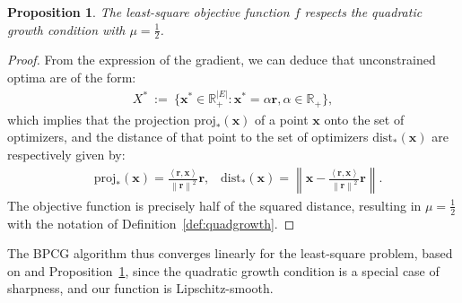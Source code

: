 \documentclass{ecai}
\newtheorem{proposition}[theorem]{Proposition}
\newcommand{\innp}[2]{\left\langle #1, #2 \right\rangle}
\newcommand{\norm}[1]{\left\| #1 \right\|}
\newcommand{\vx}{\mathbf{x}}
\newcommand{\vr}{\mathbf{r}}
\newcommand{\R}{\mathbb{R}}
\begin{document}
\begin{proposition}\label{prop:objquadratic}
The least-square objective function $f$ respects the quadratic growth condition with $\mu=\frac12$.
\end{proposition}
\begin{proof}
From the expression of the gradient, we can deduce that unconstrained optima are of the form:
\begin{align*}
X^* \ \mathrm{:=}\  \{\vx^* \in \R^{|E|}_+ : \vx^* = \alpha \vr, \alpha \in \R_+\} ,
\end{align*}
which implies that the projection $\mathrm{proj}_*(\vx)$ of a point $\vx$ onto the set of optimizers, and the distance of that point to the set of optimizers $\mathrm{dist}_*(\vx)$ are respectively given by:
\begin{align*}
    & \mathrm{proj}_*(\vx) = \frac{\innp{\vr}{\vx}}{\norm{\vr}^2} \vr, \; \; \; \mathrm{dist}_*(\vx) = \left\| \vx - \frac{\innp{\vr}{\vx}}{\norm{\vr}^2} \vr \right\|.
\end{align*}
The objective function is precisely half of the squared distance, resulting in $\mu=\frac12$ with the notation of Definition~\ref{def:quadgrowth}.
\end{proof}

The BPCG algorithm thus converges linearly for the least-square problem, based on \cite[Theorem 3.6]{wirth2024fast} and Proposition~\ref{prop:objquadratic},
since the quadratic growth condition is a special case of sharpness, and our function is Lipschitz-smooth.
\end{document}
